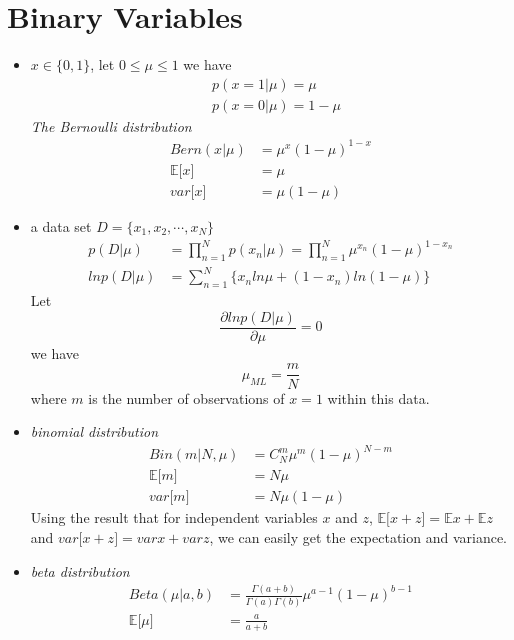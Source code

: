 \documentclass[12pt, a4paper]{article}
\newcommand{\E}{\mathbb{E}}
\begin{document}
    \section{Binary Variables}
    \begin{itemize}
        \item $x\in\{0,1\}$, let $0\le\mu\le 1$ we have
        \begin{align*}
            &p(x=1|\mu)=\mu\\
            &p(x=0|\mu)=1-\mu
        \end{align*}
        \textit{The Bernoulli distribution}
        \begin{align*}
            Bern(x|\mu)&=\mu^x(1-\mu)^{1-x}\\
            \E \lbrack x\rbrack&=\mu\\
            var\lbrack x\rbrack&=\mu(1-\mu)
        \end{align*}
        \item a data set $D=\{x_1,x_2,\cdots,x_N\}$
        \begin{align*}
            p(D|\mu)&=\prod_{n=1}^Np(x_n|\mu)=\prod_{n=1}^N\mu^{x_n}(1-\mu)^{1-x_n}\\
            lnp(D|\mu)&=\sum_{n=1}^N\{x_nln\mu+(1-x_n)ln(1-\mu)\}
        \end{align*}
        Let 
        \[\frac{\partial{lnp(D|\mu)}}{\partial{\mu}}=0\]
        we have
        \[
            \mu_{ML}=\frac{m}{N}
            \]
        where $m$ is the number of observations of $x=1$ within this data.
        \item \textit{binomial distribution}
        \begin{align*}
            Bin(m|N,\mu)&=C_N^m\mu^m(1-\mu)^{N-m} \\
            \E \lbrack m\rbrack&=N\mu\\
            var\lbrack m\rbrack&=N\mu(1-\mu)
        \end{align*}
        Using the result that for independent variables $x$ and $z$, $\E\lbrack x+z
        \rbrack=\E x+\E z$ and $var\lbrack x+z\rbrack=varx+varz$, we can easily
        get the expectation and variance.
        \item \textit{beta distribution}
        \begin{align}
            \label{BetaDistribution}
            Beta(\mu|a,b)&=\frac{\Gamma(a+b)}{\Gamma(a)\Gamma(b)}\mu^{a-1}(1-\mu)
            ^{b-1}\\
            \E\lbrack\mu\rbrack&=\frac{a}{a+b}\nonumber\\

\end{align}
\end{itemize}
\end{document}
